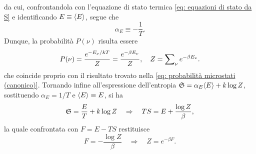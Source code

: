 da cui, confrontandola con l'equazione di stato termica \eqref{eq: equazioni di stato da S} e identificando $E \equiv \langle E \rangle$, segue che
\begin{equation}
    \alpha_E \equiv -\frac{1}{T}.
\end{equation}
Dunque, la probabilità $P(\nu)$ risulta essere
\begin{equation}
    P(\nu) = \frac{e^{-E_\nu/kT}}{Z} = \frac{e^{-\beta E_\nu}}{Z},\quad Z = \sum\nolimits_\nu e^{-\beta E_\nu}.
\end{equation}
che coincide proprio con il risultato trovato nella \eqref{eq: probabilità microstati (canonico)}. Tornando infine all'espressione dell'entropia $\mathfrak{S} = \alpha_E\langle E \rangle + k\log{Z}$, sostituendo $\alpha_E = 1/T$ e $\langle E \rangle \equiv E$, si ha
\begin{equation}
    \mathfrak{S} = \frac{E}{T} + k\log{Z}\quad\Rightarrow\quad TS = E + \frac{\log{Z}}{\beta},
\end{equation}
la quale confrontata con $F = E - TS$ restituisce 
\begin{equation}
    F = -\frac{\log{Z}}{\beta}\quad\Rightarrow\quad Z = e^{-\beta F}.
\end{equation}

